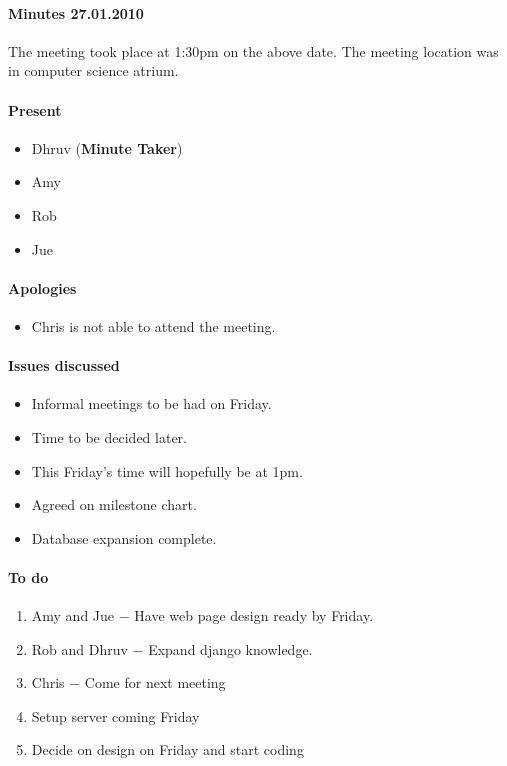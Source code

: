 \paragraph{Minutes 27.01.2010}  
The meeting took place at 1:30pm on the above date. The meeting location was in computer science atrium. 

\paragraph{Present}

\begin{itemize}
	\item Dhruv (\textbf{Minute Taker})
	\item Amy 
	\item Rob
	\item Jue
	
\end{itemize}


\paragraph{Apologies}

\begin{itemize}
	\item Chris is not able to attend the meeting.
\end{itemize}


\paragraph{Issues discussed}

\begin{itemize}
	\item Informal meetings to be had on Friday. 
	\item Time to be decided later.
	\item This Friday's time will hopefully be at 1pm.
	\item Agreed on milestone chart.
	\item Database expansion complete.
\end{itemize}

\paragraph{To do}

\begin{enumerate}
	\item Amy and Jue $-$ Have web page design ready by Friday.
	\item Rob and Dhruv $-$ Expand django knowledge.
	\item Chris $-$ Come for next meeting
	\item Setup server coming Friday
	\item Decide on design on Friday and start coding
\end{enumerate}